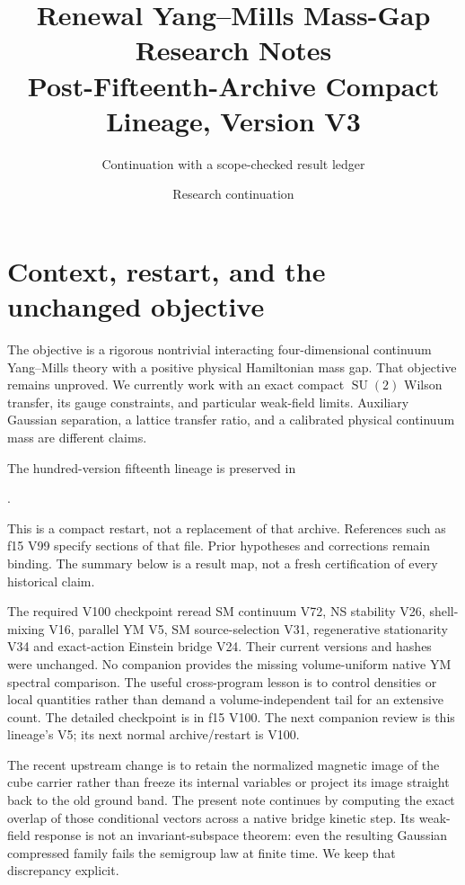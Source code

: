 \documentclass[11pt,oneside]{article}
\title{Renewal Yang--Mills Mass-Gap Research Notes\\
Post-Fifteenth-Archive Compact Lineage, Version V3}
\author{Continuation with a scope-checked result ledger}
\date{Research continuation}
\DeclareMathOperator{\SU}{SU}
\begin{document}
\maketitle
\tableofcontents

\section{Context, restart, and the unchanged objective}
\label{f16v1:context}

The objective is a rigorous nontrivial interacting four-dimensional
continuum Yang--Mills theory with a positive physical Hamiltonian mass
gap. That objective remains unproved. We currently work with an exact
compact \(\SU(2)\) Wilson transfer, its gauge constraints, and particular
weak-field limits. Auxiliary Gaussian separation, a lattice transfer
ratio, and a calibrated physical continuum mass are different claims.

The hundred-version fifteenth lineage is preserved in
\begin{center}\small
{}.
\end{center}
This is a compact restart, not a replacement of that archive.
References such as f15 V99 specify sections of that file.
Prior hypotheses and corrections remain binding. The summary below
is a result map, not a fresh certification of every historical claim.

The required V100 checkpoint reread SM continuum V72, NS stability V26,
shell-mixing V16, parallel YM V5, SM source-selection V31,
regenerative stationarity V34 and exact-action Einstein bridge V24.
Their current versions and hashes were unchanged. No companion
provides the missing volume-uniform native YM spectral comparison.
The useful cross-program lesson is to control densities or local
quantities rather than demand a volume-independent tail for an
extensive count. The detailed checkpoint is in f15 V100.
The next companion review is this lineage's V5; its next normal
archive/restart is V100.

The recent upstream change is to retain the normalized magnetic
image of the cube carrier rather than freeze its internal variables
or project its image straight back to the old ground band.
The present note continues by computing the exact overlap of those
conditional vectors across a native bridge kinetic step.
Its weak-field response is not an invariant-subspace theorem:
even the resulting Gaussian compressed family fails the semigroup
law at finite time. We keep that discrepancy explicit.
\end{document}

